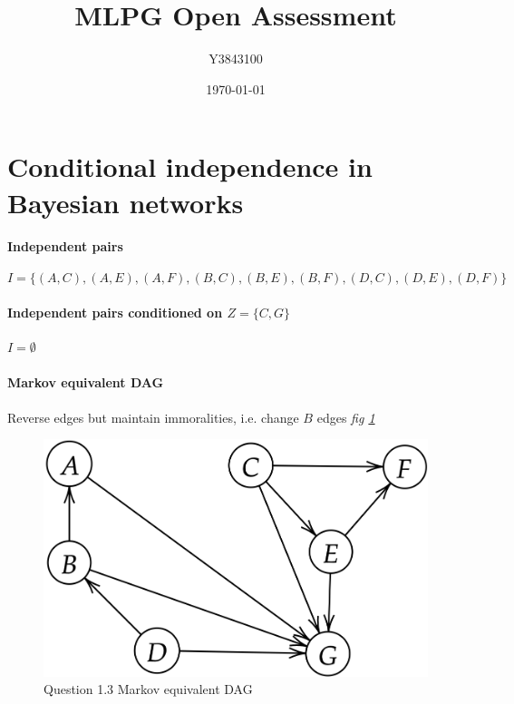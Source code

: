 \documentclass[11pt,a4paper]{article}
\title{MLPG Open Assessment}
\author{Y3843100}
\date{\today}
\begin{document}
\maketitle


\section{Conditional independence in Bayesian networks}

\paragraph{Independent pairs}
\[I = \{(A,C),(A,E),(A,F),(B,C),(B,E),(B,F),(D,C),(D,E),(D,F)\}\]

\paragraph{Independent pairs conditioned on \(Z = \{C,G\}\)}

$I = \emptyset$

\paragraph{Markov equivalent DAG}
Reverse edges but maintain immoralities, i.e. change \(B\) edges \textit{fig \ref{fig:1.3}}

\begin{figure}[htb]
  \centering
    \includegraphics[width=\textwidth]{../q1/fig13.png}
    \caption{Question 1.3 Markov equivalent DAG}
  \label{fig:1.3}
\end{figure}
\end{document}
